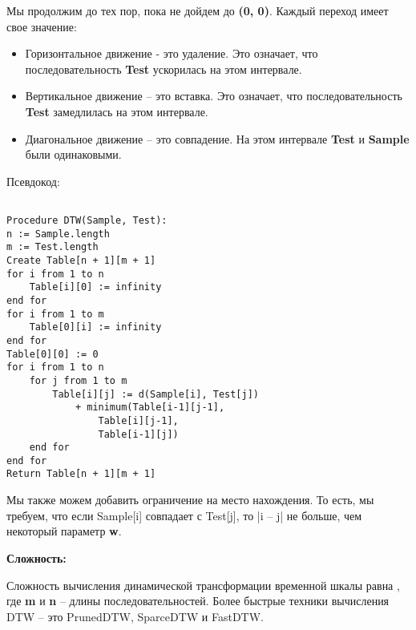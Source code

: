 \vspace{\baselineskip}
\vspace{-0.2cm}
Мы продолжим до тех пор, пока не дойдем до \textbf{(0, 0)}. Каждый переход имеет свое значение:

\vspace{-0.1cm}
\begin{itemize}
  \item	Горизонтальное движение - это удаление. Это означает, что последовательность \textbf{Test} ускорилась на этом интервале.
  \vspace{-0.3cm}
  \item	Вертикальное движение – это вставка. Это означает, что последовательность \textbf{Test} замедлилась на этом интервале.
  \vspace{-0.3cm}
   \item Диагональное движение – это совпадение. На этом интервале \textbf{Test} и \textbf{Sample} были одинаковыми.
\end{itemize}

\vspace{\baselineskip}

\vspace{-1cm}
Псевдокод:

\begin{tcolorbox}
\begin{verbatim}

Procedure DTW(Sample, Test):
n := Sample.length
m := Test.length
Create Table[n + 1][m + 1]
for i from 1 to n
    Table[i][0] := infinity
end for
for i from 1 to m
    Table[0][i] := infinity
end for
Table[0][0] := 0
for i from 1 to n
    for j from 1 to m
        Table[i][j] := d(Sample[i], Test[j])
            + minimum(Table[i-1][j-1],
                Table[i][j-1],
                Table[i-1][j])
    end for
end for
Return Table[n + 1][m + 1]

\end{verbatim}
\end{tcolorbox}

\vspace{\baselineskip}
\vspace{-0.3cm}
Мы также можем добавить ограничение на место нахождения. То есть, мы требуем, что если Sample[i] совпадает с Test[j], то |i – j| не больше, чем некоторый параметр \textbf{w}.

\vspace{\baselineskip}
\textbf{Сложность:}

\vspace{\baselineskip}
\vspace{-0.3cm}
Сложность вычисления динамической трансформации временной шкалы равна , где \textbf{m} и \textbf{n} – длины последовательностей. Более быстрые техники вычисления DTW – это PrunedDTW, SparceDTW и FastDTW.

